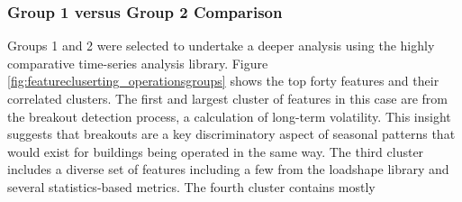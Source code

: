 \subsubsection{Group 1 versus Group 2 Comparison}
\label{sec:group1vsgroup2}

Groups 1 and 2 were selected to undertake a deeper analysis using the highly comparative time-series analysis library. Figure \ref{fig:featurecluserting_operationsgroups} shows the top forty features and their correlated clusters. The first and largest cluster of features in this case are from the breakout detection process, a calculation of long-term volatility. This insight suggests that breakouts are a key discriminatory aspect of seasonal patterns that would exist for buildings being operated in the same way. The third cluster includes a diverse set of features including a few from the loadshape library and several statistics-based metrics. The fourth cluster contains mostly 
